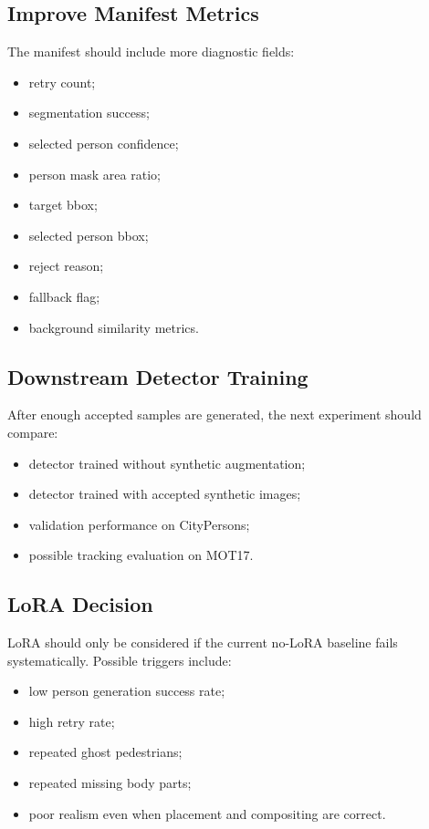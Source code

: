 \documentclass[12pt,a4paper]{article}
\begin{document}
\subsection{Improve Manifest Metrics}

The manifest should include more diagnostic fields:

\begin{itemize}
    \item retry count;
    \item segmentation success;
    \item selected person confidence;
    \item person mask area ratio;
    \item target bbox;
    \item selected person bbox;
    \item reject reason;
    \item fallback flag;
    \item background similarity metrics.
\end{itemize}

\subsection{Downstream Detector Training}

After enough accepted samples are generated, the next experiment should compare:

\begin{itemize}
    \item detector trained without synthetic augmentation;
    \item detector trained with accepted synthetic images;
    \item validation performance on CityPersons;
    \item possible tracking evaluation on MOT17.
\end{itemize}

\subsection{LoRA Decision}

LoRA should only be considered if the current no-LoRA baseline fails
systematically. Possible triggers include:

\begin{itemize}
    \item low person generation success rate;
    \item high retry rate;
    \item repeated ghost pedestrians;
    \item repeated missing body parts;
    \item poor realism even when placement and compositing are correct.
\end{itemize}
\end{document}
